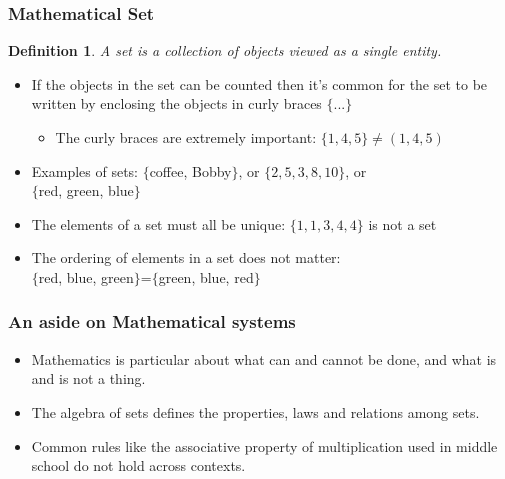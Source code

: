 \documentclass[aspectratio=169, handout]{beamer}
\newtheorem{defn}{Definition}
\numberwithin{equation}{section}
\begin{document}
\begin{frame}
\frametitle{Mathematical Set}

\begin{defn}
A set is a collection of objects viewed as a single entity.
\end{defn}
\pause

\begin{itemize}
\item If the objects in the set can be counted then it's common for the set to be written by enclosing the objects in curly braces $\{...\}$ \pause
 
\begin{itemize}
\item The curly braces are extremely important: $\{1, 4, 5\}\not=(1, 4, 5)$ \pause
\end{itemize}
 
\item Examples of sets: $\{$coffee, Bobby$\}$, or $\{2, 5, 3, 8, 10\}$, or \\$\{$red, green, blue$\}$ \pause
 
\item The elements of a set must all be unique: $\{1, 1, 3, 4, 4\}$ is not a set \pause

\item The ordering of elements in a set does not matter: \\$\{$red, blue, green$\}$=$\{$green, blue, red$\}$

\end{itemize}
\end{frame}


\begin{frame}
\frametitle{An aside on Mathematical systems}

\begin{itemize}
\item Mathematics is particular about what can and cannot be done, and what is and is not a thing.
\item The algebra of sets defines the properties, laws and relations among sets.
\item Common rules like the associative property of multiplication used in middle school do not hold across contexts.
\end{itemize}
\end{frame}
\end{document}
